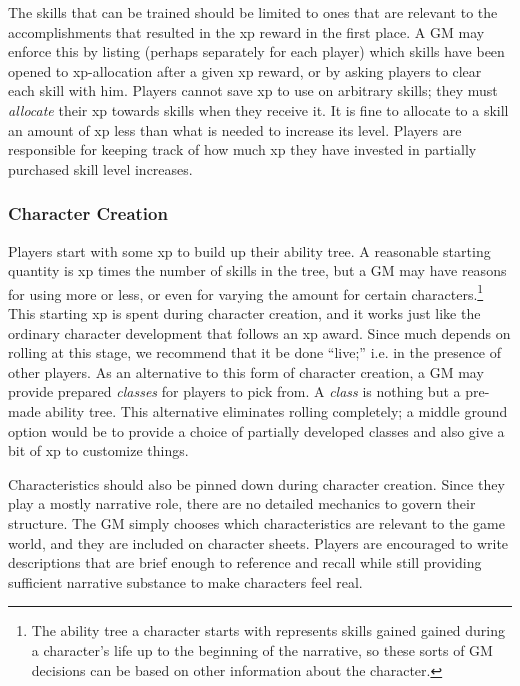 \documentclass[12pt]{article}
\begin{document}
The skills that can be trained should be limited to ones that are relevant to the accomplishments that resulted in the xp reward in the first place.
A GM may enforce this by listing 
(perhaps separately for each player)
which skills have been opened
to xp-allocation after a given xp reward,
or by asking players to clear each skill with him.
Players cannot save xp to use on arbitrary skills; they must \emph{allocate} their xp towards skills when they receive it.
It is fine to allocate to a skill an amount of xp less than what is needed to increase its level.
Players are responsible for keeping track of how much xp they have invested in partially purchased skill level increases.

\subsubsection{Character Creation}\label{sec:creation}
Players start with some xp to build up their ability tree. 
A reasonable starting quantity is xp times the number of skills in the tree,
but a GM may have reasons for using more or less, or even for varying the amount for certain characters.\footnote{
The ability tree a character starts with represents skills gained
gained during a character's life up to the beginning of the narrative,
so these sorts of GM decisions can be based on other information about the character.}
This starting xp is spent during character creation, and it works just like the ordinary character development that follows an xp award.
Since much depends on rolling at this stage, we recommend that it be done ``live;'' i.e. in the presence of other players.
As an alternative to this form of character creation, a GM may provide prepared \emph{classes} for players to pick from.
A \emph{class} is nothing but a pre-made ability tree.
This alternative eliminates rolling completely; a middle ground option would be to provide a choice
of partially developed classes and also give a bit of xp to customize things.

Characteristics should also be pinned down during character creation.
Since they play a mostly narrative role, there are no detailed mechanics to govern their structure.
The GM simply chooses which characteristics are relevant to the game world, and they are included on character sheets.
Players are encouraged to write descriptions that are brief enough to reference and recall while still
providing sufficient narrative substance to make characters feel real.
\end{document}
